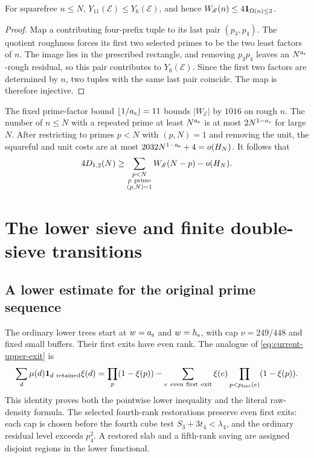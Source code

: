 \begin{lemma}
\label{lem:current-paired-injection}
For squarefree $n\le N$, $Y_{11}(\mathscr E)\le Y_6(\mathscr E)$, and hence
$W_{\mathscr E}(n)\le4{\mathbf 1}_{\Omega(n)\le2}$.
\end{lemma}

\begin{proof}
Map a contributing four-prefix tuple to its last pair $(p_3,p_4)$.
The quotient roughness forces its first two selected primes to be
the two least factors of $n$. The image lies in the prescribed
rectangle, and removing $p_3p_4$ leaves an $N^{a_{\rm s}}$-rough residual,
so this pair contributes to $Y_6(\mathscr E)$. Since the first two factors
are determined by $n$, two tuples with the same last pair coincide.
The map is therefore injective.
\end{proof}

The fixed prime-factor bound $\lfloor1/{a_{\rm s}}\rfloor=11$ bounds
$|W_{\mathscr E}|$ by $1016$ on rough $n$.  The number of $n\le N$ with a
repeated prime at least $N^{a_{\rm s}}$ is at most $2N^{1-{a_{\rm s}}}$ for large $N$.
After restricting to primes $p<N$ with $(p,N)=1$ and removing the
unit, the squareful and unit costs are at most
$2032N^{1-{a_{\rm s}}}+4=o(H_N)$.  It follows that
\begin{equation}
 4D_{1,2}(N)\ge
       \sum_{\substack{p<N\\p\ {\rm prime}\\(p,N)=1}}W_{\mathscr E}(N-p)
        -o(H_N).
 \label{eq:current-weight-to-count}
\end{equation}

\section{The lower sieve and finite double-sieve transitions}
\label{sec:current-lower}

\subsection{A lower estimate for the original prime sequence}

The ordinary lower trees start at $w={a_{\rm s}}$ and $w={h_{\rm s}}$, with cap
$\nu=249/448$ and fixed small buffers.  Their first exits have even
rank.  The analogue of \eqref{eq:current-upper-exit} is
\begin{equation}
 \sum_d\mu(d){\mathbf 1}_{d\ {\rm retained}}\xi(d)
 =\prod_p(1-\xi(p))
  -\sum_{e\ {\rm even\ first\ exit}}\xi(e)
                       \prod_{p<p_{\rm last}(e)}(1-\xi(p)).
 \label{eq:current-lower-exit}
\end{equation}
This identity proves both the pointwise lower inequality and the
literal raw-density formula. The selected fourth-rank restorations
preserve even first exits: each cap is chosen before the fourth cube
test $S_3+3t_4<\lambda_4$, and the ordinary residual level exceeds
$p_4^2$. A restored slab and a fifth-rank saving are
assigned disjoint regions in the lower functional.

